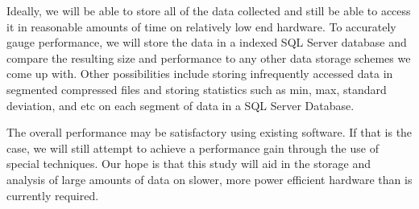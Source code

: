 \documentclass[twocolumn]{article}
\begin{document}
{Ideally, we will be able to store all of the data collected and still be able to access it in reasonable amounts of time on relatively low end hardware. To accurately gauge performance, we will store the data in a indexed SQL Server database and compare the resulting size and performance to any other data storage schemes we come up with. Other possibilities include storing infrequently accessed data in segmented compressed files and storing statistics such as min, max, standard deviation, and etc on each segment of data in a SQL Server Database. 

The overall performance may be satisfactory using existing software. If that is the case, we will still attempt to achieve a performance gain through the use of special techniques. Our hope is that this study will aid in the storage and analysis of large amounts of data on slower, more power efficient hardware than is currently required.
}
\end{document}
